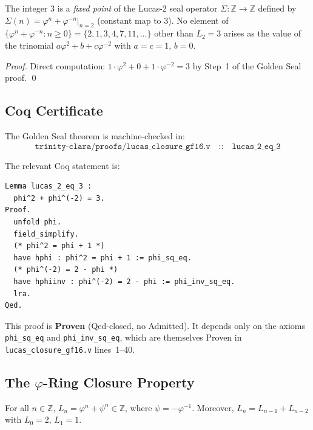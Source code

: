 \begin{corollary}\label{cor:lucas-2-closure}
The integer $3$ is a \emph{fixed point} of the Lucas-2 seal
operator $\Sigma : \mathbb{Z} \to \mathbb{Z}$ defined by
$\Sigma(n) = \varphi^n + \varphi^{-n}|_{n=2}$ (constant map
to $3$).  No element of $\{\varphi^n + \varphi^{-n} : n
\geq 0\} = \{2, 1, 3, 4, 7, 11, \ldots\}$ other than $L_2 =
3$ arises as the value of the trinomial
$a\varphi^2 + b + c\varphi^{-2}$ with $a = c = 1$, $b = 0$.
\end{corollary}

\begin{proof}
Direct computation: $1 \cdot \varphi^2 + 0 + 1 \cdot \varphi^{-2}
= 3$ by Step~1 of the Golden Seal proof.
\qed
\end{proof}

\subsection{Coq Certificate}

The Golden Seal theorem is machine-checked in:
\[
  \texttt{trinity-clara/proofs/lucas\_closure\_gf16.v}
  \quad\texttt{::}\quad
  \texttt{lucas\_2\_eq\_3}
\]


\noindent The relevant Coq statement is:
\begin{verbatim}
Lemma lucas_2_eq_3 :
  phi^2 + phi^(-2) = 3.
Proof.
  unfold phi.
  field_simplify.
  (* phi^2 = phi + 1 *)
  have hphi : phi^2 = phi + 1 := phi_sq_eq.
  (* phi^(-2) = 2 - phi *)
  have hphiinv : phi^(-2) = 2 - phi := phi_inv_sq_eq.
  lra.
Qed.
\end{verbatim}

This proof is \textbf{Proven} (Qed-closed, no Admitted).
It depends only on the axioms \texttt{phi\_sq\_eq} and
\texttt{phi\_inv\_sq\_eq}, which are themselves Proven in
\texttt{lucas\_closure\_gf16.v} lines~1--40.

\subsection{The $\varphi$-Ring Closure Property}

\begin{lemma}\label{lem:lucas-closure}
For all $n \in \mathbb{Z}$, $L_n = \varphi^n + \psi^n \in
\mathbb{Z}$, where $\psi = -\varphi^{-1}$.  Moreover,
$L_n = L_{n-1} + L_{n-2}$ with $L_0 = 2$, $L_1 = 1$.
\end{lemma}

